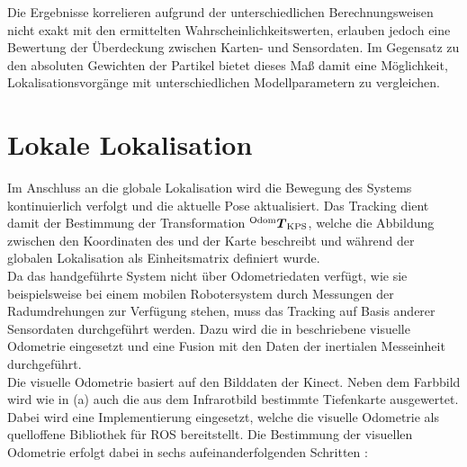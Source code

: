 
Die Ergebnisse korrelieren aufgrund der unterschiedlichen Berechnungsweisen nicht exakt mit den ermittelten Wahrscheinlichkeitswerten, erlauben jedoch eine Bewertung der Überdeckung zwischen Karten- und Sensordaten. Im Gegensatz zu den absoluten Gewichten der Partikel bietet dieses Maß damit eine Möglichkeit, Lokalisationsvorgänge mit unterschiedlichen Modellparametern zu vergleichen.

\prever{
}

\section{Lokale Lokalisation}
\label{locloc}
Im Anschluss an die globale Lokalisation wird die Bewegung des Systems kontinuierlich verfolgt und die aktuelle Pose aktualisiert. Das Tracking dient damit der Bestimmung der Transformation ${^{\mathrm{Odom}}\mbox{\boldmath{$T$}}_{\mathrm{KPS}}}$, welche die Abbildung zwischen den Koordinaten des  und der Karte beschreibt und während der globalen Lokalisation als Einheitsmatrix definiert wurde.\\

Da das handgeführte System nicht über Odometriedaten verfügt, wie sie beispielsweise bei einem mobilen Robotersystem durch Messungen der Radumdrehungen zur Verfügung stehen, muss das Tracking auf Basis anderer Sensordaten durchgeführt werden. Dazu wird die in  beschriebene visuelle Odometrie eingesetzt und eine Fusion mit den Daten der inertialen Messeinheit durchgeführt.\\

Die visuelle Odometrie basiert auf den Bilddaten der Kinect. Neben dem Farbbild wird wie in  (a) auch die aus dem Infrarotbild bestimmte Tiefenkarte ausgewertet. Dabei wird eine Implementierung \cite{Fovis} eingesetzt, welche die visuelle Odometrie als quelloffene Bibliothek für ROS bereitstellt. Die Bestimmung der visuellen Odometrie erfolgt dabei in sechs aufeinanderfolgenden Schritten \cite{Huang2011}:


